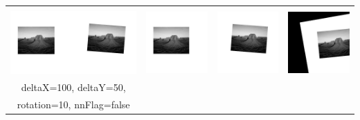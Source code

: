 \documentclass[12pt,german]{article}
\begin{document}
\begin{table}[H]
\begin{tabular}{| c | c | c | c |}
    
    \hline
     & & & \\
    \includegraphics[width=5cm]{images/register/gray1.jpg}  &
    \includegraphics[width=2.5cm]{images/register/first-half-image-01.jpg} &
    \includegraphics[width=2.5cm]{images/register/second-half-image-01.jpg} &
    \includegraphics[width=2.5cm]{images/register/transformed-image-02.jpg} \\
    deltaX=100, deltaY=50, & & & \\
    rotation=10, nnFlag=false  & & & \\
    

\end{tabular}
\end{table}
\end{document}
